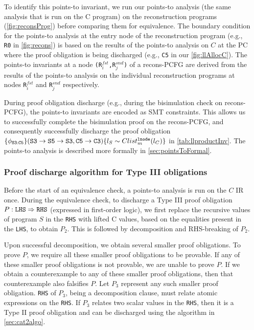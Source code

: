 To identify this points-to invariant, we run
our points-to analysis (the same analysis that is run
on the C program) on the reconstruction programs (\cref{fig:reconsProg})
before
comparing them for equivalence. The boundary
condition for the points-to analysis at the
entry node of the reconstruction
program (e.g., {\tt R0} in \cref{fig:recons}) is based on
the results of the points-to analysis
on $C$ at the PC where the proof obligation is being discharged (e.g., {\tt C5}
in our \cref{fig:llAllocC}). The points-to invariants
at a node {\tt (R$^{fst}_i$,R$^{snd}_j$)} of a recons-PCFG are
derived from the results of the points-to analysis on the individual
reconstruction programs at nodes {\tt R}$^{fst}_i$ and {\tt R}$^{snd}_j$
respectively.

During proof obligation discharge (e.g., during the bisimulation
check on recons-PCFG), the points-to invariants are encoded as SMT constraints.
This allows us to successfully
complete the bisimulation proof on the recons-PCFG, and
consequently successfully discharge the
proof obligation
$\{\phi_{{\tt S3:C5}}\}\\({\tt S3\rightarrow S5\rightarrow S3}, {\tt C5\rightarrow C3}) \{l_{S}\sim{}Clist^{{\tt lnode}}_{m}(l_{C})\}$ in \cref{tab:llproductInv}.
The points-to analysis is described more formally
in \cref{sec:pointsToFormal}.

\vspace{-5px}
\subsubsection{Proof discharge algorithm for Type III obligations}
\label{sec:cat3summary}

Before the start of an equivalence check, a points-to analysis is run on the $C$ IR once.
During the equivalence check,
to discharge a Type III proof obligation $P: {\tt LHS}\Rightarrow{\tt RHS}$ (expressed
in first-order logic), we first replace the recursive
values of program $S$ in the {\tt RHS}
with lifted C values, based on the equalities present in the {\tt LHS}, to
obtain $P_2$.
This is followed by decomposition and RHS-breaking of $P_2$.

Upon successful decomposition, we
obtain several smaller proof obligations.
To prove $P$, we require all these smaller proof
obligations to be provable. If any of these smaller proof obligations
is not provable, we are unable to prove $P$.  If we obtain a counterexample
to any of these smaller proof obligations, then that counterexample
also falsifies $P$.
Let $P_3$ represent any such smaller proof obligation.
{\tt RHS} of $P_3$, being
a decomposition clause,
must relate atomic expressions on the {\tt RHS}.
If $P_3$ relates two scalar values in the {\tt RHS}, then
it is a Type II proof obligation and can be discharged
using the algorithm in \cref{sec:cat2algo}.

